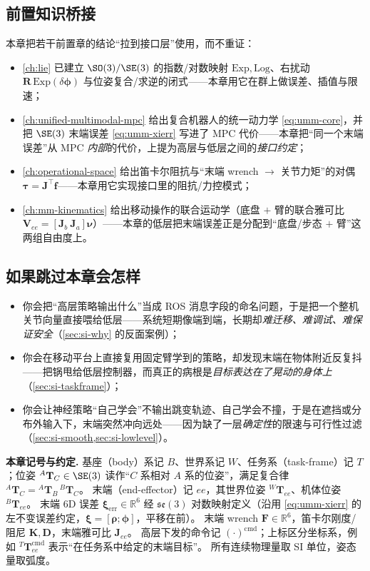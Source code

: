 \subsection*{前置知识桥接}
本章把若干前置章的结论“拉到接口层”使用，而不重证：
\begin{itemize}
  \item \cref{ch:lie} 已建立 $\SO(3)/\SE(3)$ 的指数/对数映射 $\mathrm{Exp},\mathrm{Log}$、右扰动 $\mathbf R\,\mathrm{Exp}(\delta\boldsymbol\phi)$ 与位姿复合/求逆的闭式——本章用它在群上做误差、插值与限速；
  \item \cref{ch:unified-multimodal-mpc} 给出复合机器人的统一动力学 \cref{eq:umm-core}，并把 $\SE(3)$ 末端误差 \cref{eq:umm-xierr} 写进了 MPC 代价——本章把“同一个末端误差”从 MPC \emph{内部}的代价，上提为高层与低层之间的\emph{接口约定}；
  \item \cref{ch:operational-space} 给出笛卡尔阻抗与“末端 wrench $\to$ 关节力矩”的对偶 $\boldsymbol\tau=\mathbf J^\top\mathbf f$——本章用它实现接口里的阻抗/力控模式；
  \item \cref{ch:mm-kinematics} 给出移动操作的联合运动学（底盘 $+$ 臂的联合雅可比 $\mathbf V_{ee}=[\mathbf J_b\ \mathbf J_a]\boldsymbol\nu$）——本章的低层把末端误差正是分配到“底盘/步态 $+$ 臂”这两组自由度上。
\end{itemize}

\subsection*{如果跳过本章会怎样}
\begin{itemize}
  \item 你会把“高层策略输出什么”当成 ROS 消息字段的命名问题，于是把一个整机关节向量直接喂给低层——系统短期像端到端，长期却\emph{难迁移、难调试、难保证安全}（\cref{sec:si-why} 的反面案例）；
  \item 你会在移动平台上直接复用固定臂学到的策略，却发现末端在物体附近反复抖——把锅甩给低层控制器，而真正的病根是\emph{目标表达在了晃动的身体上}（\cref{sec:si-taskframe}）；
  \item 你会让神经策略“自己学会”不输出跳变轨迹、自己学会不撞，于是在遮挡或分布外输入下，末端突然冲向远处——因为缺了一层\emph{确定性}的限速与可行性过滤（\cref{sec:si-smooth,sec:si-lowlevel}）。
\end{itemize}

\begin{note}
\textbf{本章记号与约定.}\;
基座（body）系记 $B$、世界系记 $W$、任务系（task-frame）记 $T$；位姿 ${}^{A}\mathbf{T}_{C}\in\SE(3)$ 读作“$C$ 系相对 $A$ 系的位姿”，满足复合律 ${}^{A}\mathbf{T}_{C}={}^{A}\mathbf{T}_{B}\,{}^{B}\mathbf{T}_{C}$。
末端（end-effector）记 $ee$，其世界位姿 ${}^{W}\mathbf{T}_{ee}$、机体位姿 ${}^{B}\mathbf{T}_{ee}$。
末端 $6$D 误差 $\boldsymbol\xi_{\mathrm{err}}\in\mathbb R^6$ 经 $\mathfrak{se}(3)$ 对数映射定义（沿用 \cref{eq:umm-xierr} 的左不变误差约定，$\boldsymbol\xi=[\boldsymbol\rho;\boldsymbol\phi]$，平移在前）。
末端 wrench $\mathbf F\in\mathbb R^6$，笛卡尔刚度/阻尼 $\mathbf K,\mathbf D$，末端雅可比 $\mathbf J_{ee}$。
高层下发的命令记 $(\cdot)^{\mathrm{cmd}}$；上标区分坐标系，例如 ${}^{T}\mathbf{T}_{ee}^{\mathrm{cmd}}$ 表示“在任务系中给定的末端目标”。
所有连续物理量取 SI 单位，姿态量取弧度。
\end{note}

